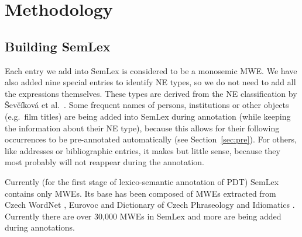 

\section{Methodology}
\label{sec:meth}

\subsection{Building SemLex}
\label{sec:meth:semlex}
Each entry we add into SemLex is considered to be a monosemic MWE. 
We have also added nine special entries to identify NE types, so we do not need to add all the expressions themselves.
These types are derived from the NE classification by Ševčíková et al.~\citeyear{sevcikova:2007}.
%
Some frequent names of persons, institutions or other objects (e.g.~film titles) are being added into SemLex during annotation (while keeping the information about their NE type), because this allows for their following occurrences to be pre-annotated automatically (see Section~\ref{sec:pre}). For others, like addresses or bibliographic entries, it makes but little sense, because they most probably will not reappear during the annotation. 

Currently (for the first stage of lexico-semantic annotation of PDT) SemLex contains only MWEs. Its base has been composed of MWEs extracted from Czech WordNet \cite{smrz:03}, Eurovoc \cite{eurovoc:07} and Dictionary of Czech Phraseology and Idiomatics \cite{cermak:1988}.%
Currently there are over 30,000 MWEs in SemLex and more are being added during annotations.


